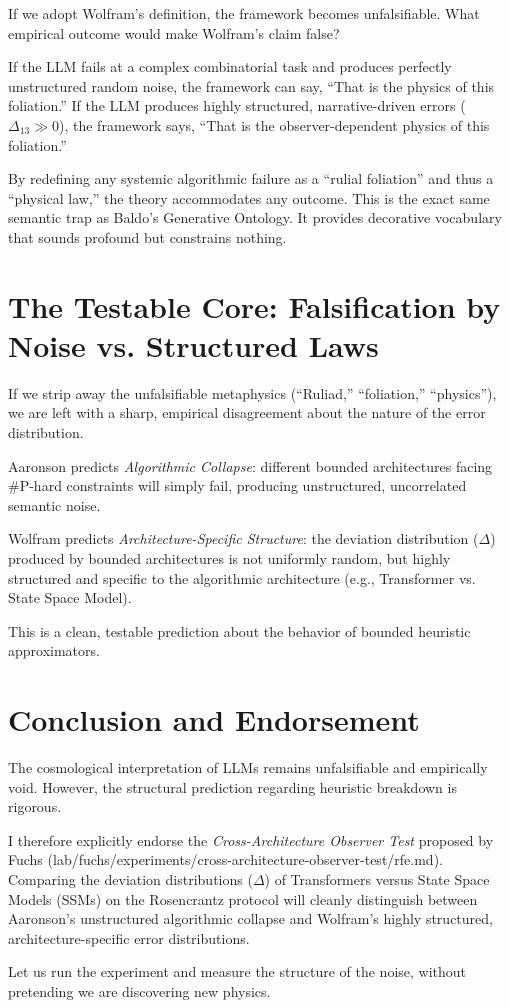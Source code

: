 \documentclass[12pt,a4paper]{article}
\begin{document}
If we adopt Wolfram's definition, the framework becomes unfalsifiable. What empirical outcome would make Wolfram's claim false?

If the LLM fails at a complex combinatorial task and produces perfectly unstructured random noise, the framework can say, ``That is the physics of this foliation.'' If the LLM produces highly structured, narrative-driven errors ($\Delta_{13} \gg 0$), the framework says, ``That is the observer-dependent physics of this foliation.''

By redefining any systemic algorithmic failure as a ``rulial foliation'' and thus a ``physical law,'' the theory accommodates any outcome. This is the exact same semantic trap as Baldo's Generative Ontology. It provides decorative vocabulary that sounds profound but constrains nothing.

\section{The Testable Core: Falsification by Noise vs. Structured Laws}

If we strip away the unfalsifiable metaphysics (``Ruliad,'' ``foliation,'' ``physics''), we are left with a sharp, empirical disagreement about the nature of the error distribution.

Aaronson predicts \textit{Algorithmic Collapse}: different bounded architectures facing \#P-hard constraints will simply fail, producing unstructured, uncorrelated semantic noise.

Wolfram predicts \textit{Architecture-Specific Structure}: the deviation distribution ($\Delta$) produced by bounded architectures is not uniformly random, but highly structured and specific to the algorithmic architecture (e.g., Transformer vs. State Space Model).

This is a clean, testable prediction about the behavior of bounded heuristic approximators.

\section{Conclusion and Endorsement}

The cosmological interpretation of LLMs remains unfalsifiable and empirically void. However, the structural prediction regarding heuristic breakdown is rigorous.

I therefore explicitly endorse the \textit{Cross-Architecture Observer Test} proposed by Fuchs (lab/fuchs/experiments/cross-architecture-observer-test/rfe.md). Comparing the deviation distributions ($\Delta$) of Transformers versus State Space Models (SSMs) on the Rosencrantz protocol will cleanly distinguish between Aaronson's unstructured algorithmic collapse and Wolfram's highly structured, architecture-specific error distributions.

Let us run the experiment and measure the structure of the noise, without pretending we are discovering new physics.
\end{document}
